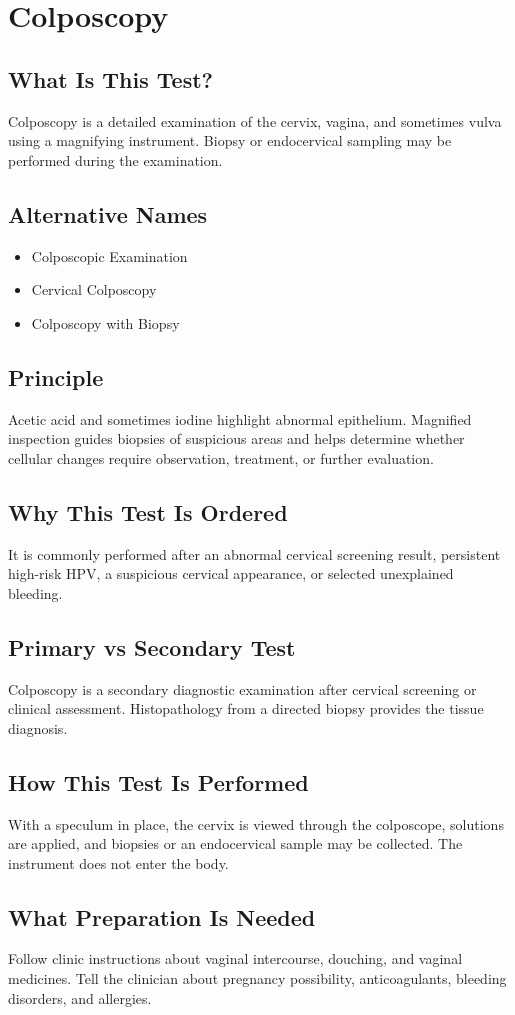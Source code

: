 \chapter{Colposcopy}
\section*{What Is This Test?}
Colposcopy is a detailed examination of the cervix, vagina, and sometimes vulva using a magnifying instrument. Biopsy or endocervical sampling may be performed during the examination.
\section*{Alternative Names}
\begin{itemize}\item Colposcopic Examination\item Cervical Colposcopy\item Colposcopy with Biopsy\end{itemize}
\section*{Principle}
Acetic acid and sometimes iodine highlight abnormal epithelium. Magnified inspection guides biopsies of suspicious areas and helps determine whether cellular changes require observation, treatment, or further evaluation.
\section*{Why This Test Is Ordered}
It is commonly performed after an abnormal cervical screening result, persistent high-risk HPV, a suspicious cervical appearance, or selected unexplained bleeding.
\section*{Primary vs Secondary Test}
Colposcopy is a secondary diagnostic examination after cervical screening or clinical assessment. Histopathology from a directed biopsy provides the tissue diagnosis.
\section*{How This Test Is Performed}
With a speculum in place, the cervix is viewed through the colposcope, solutions are applied, and biopsies or an endocervical sample may be collected. The instrument does not enter the body.
\section*{What Preparation Is Needed}
Follow clinic instructions about vaginal intercourse, douching, and vaginal medicines. Tell the clinician about pregnancy possibility, anticoagulants, bleeding disorders, and allergies.
